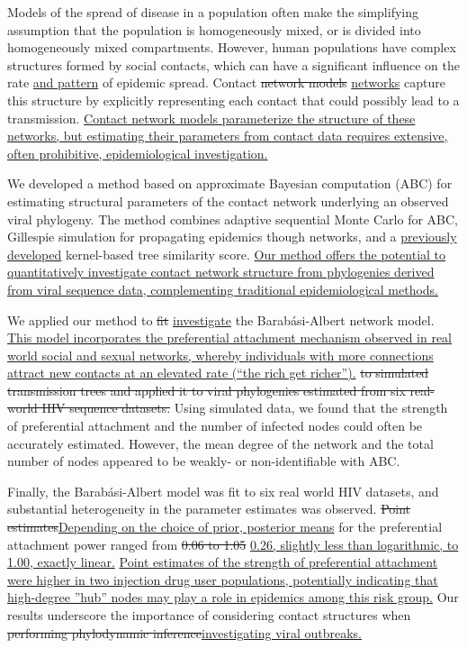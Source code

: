 Models of the spread of disease in a population often make the simplifying
assumption that the population is homogeneously mixed, or is divided into
homogeneously mixed compartments. However, human populations have complex
structures formed by social contacts, which can have a significant influence on
the rate {\color{blue}\uline{and pattern}} of epidemic spread. Contact
{\color{red}\sout{network models}} {\color{blue}\uline{networks}} capture this
structure by explicitly representing each contact that could possibly lead to a
transmission. {\color{blue}\uline{Contact network models parameterize the
structure of these networks, but estimating their parameters from contact data
requires extensive, often prohibitive, epidemiological investigation. }}

We developed a method based on approximate Bayesian computation (ABC) for
estimating structural parameters of the contact network underlying an
observed viral phylogeny. The method combines adaptive sequential Monte Carlo
for ABC, Gillespie simulation for propagating epidemics though networks, and a
{\color{blue}\uline{previously developed}} kernel-based tree similarity score.
{\color{blue}\uline{Our method offers the potential to quantitatively
investigate contact network structure from phylogenies derived from viral
sequence data, complementing traditional epidemiological methods.}}

We applied our method to {\color{red}\sout{fit}}
{\color{blue}\uline{investigate}} the Barab\'{a}si-Albert network model.
{\color{blue}\uline{This model incorporates the preferential attachment
mechanism observed in real world social and sexual networks, whereby
individuals with more connections attract new contacts at an elevated rate
(``the rich get richer'').}}
{\color{red}\sout{to simulated transmission trees and applied it to viral
phylogenies estimated from six real-world HIV sequence datasets.}} Using
simulated data, we found that the strength of preferential attachment and the
number of infected nodes could often be accurately estimated. However, the mean
degree of the network and the total number of nodes appeared to be weakly- or
non-identifiable with ABC. 

Finally, the Barab\'{a}si-Albert model was fit to six real world HIV datasets,
and substantial heterogeneity in the parameter estimates was observed.
{\color{red}\sout{Point estimates}}{\color{blue}\uline{Depending on the choice
of prior, posterior means}} for the preferential attachment power ranged from
{\color{red}\sout{0.06 to 1.05}} {\color{blue}\uline{0.26, slightly less than
logarithmic, to 1.00, exactly linear.}} {\color{blue}\uline{Point estimates of
the strength of preferential attachment were higher in two injection drug user
populations, potentially indicating that high-degree ''hub'' nodes may play a
role in epidemics among this risk group.}} Our results underscore the
importance of considering contact structures when {\color{red}\sout{performing
phylodynamic inference}}{\color{blue}\uline{investigating viral outbreaks.}}
